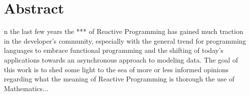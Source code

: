 %
%
%

\chapter*{Abstract}
\begin{SingleSpace}
n the last few years the *** of Reactive Programming has gained much traction in the developer's community, especially with the general trend for programming languages to embrace functional programming and the shifting of today's applications towards an asynchronous approach to modeling data. The goal of this work is to shed some light to the sea of more or less informed opinions regarding what the meaning of Reactive Programming is thorough the use of Mathematics...
\end{SingleSpace}
\clearpage